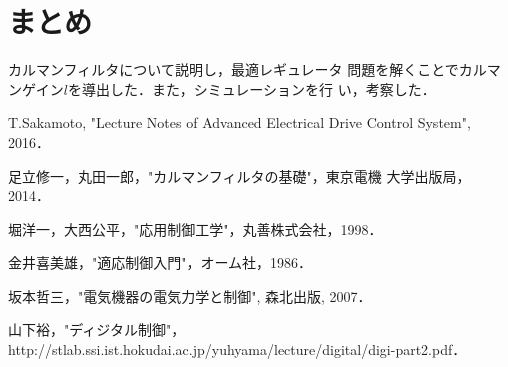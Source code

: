 \documentclass[a4paper,12pt]{jarticle}
\begin{document}
\section{まとめ}
カルマンフィルタについて説明し，最適レギュレータ
問題を解くことでカルマンゲイン$l$を導出した．また，シミュレーションを行
い，考察した．
%
\begin{thebibliography}{99}

  T.Sakamoto,
		 "Lecture Notes of Advanced Electrical Drive Control System",
		 2016．

  足立修一，丸田一郎，"カルマンフィルタの基礎"，東京電機
		 大学出版局，2014．

  堀洋一，大西公平，"応用制御工学"，丸善株式会社，1998．

  金井喜美雄，"適応制御入門"，オーム社，1986．

  坂本哲三，"電気機器の電気力学と制御", 森北出版, 2007．

  山下裕，"ディジタル制御"，http://stlab.ssi.ist.hokudai.ac.jp/yuhyama/lecture/digital/digi-part2.pdf．
		 
\end{thebibliography}
\end{document}
